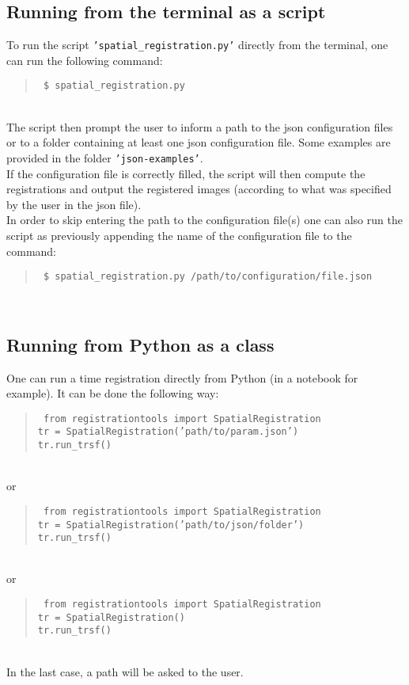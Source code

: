\documentclass[10pt,a4paper]{book}
\newcommand{\option}[1]{{\texttt{'#1'}}}
\newenvironment{code}[1]{\mbox{}\\[1ex]\hspace*{-#1cm}\begin{minipage}{150mm}\begin{quote}\tt}{\end{quote}\end{minipage}\mbox{}\\[1ex]}
\begin{document}
\subsection{Running from the terminal as a script}
To run the script \option{spatial\_registration.py} directly from the terminal, one can run the following command:
\begin{code}{0.8}
\$ spatial\_registration.py
\end{code}
The script then prompt the user to inform a path to the json configuration files or to a folder containing at least one json configuration file. Some examples are provided in the folder \option{json-examples}.\\
If the configuration file is correctly filled, the script will then compute the registrations and output the registered images (according to what was specified by the user in the json file).\\
In order to skip entering the path to the configuration file(s) one can also run the script as previously appending the name of the configuration file to the command:
\begin{code}{0.8}
\$ spatial\_registration.py /path/to/configuration/file.json
\end{code}

\subsection{Running from Python as a class}
One can run a time registration directly from Python (in a notebook for example). It can be done the following way:
\begin{code}{0.8}
from registrationtools import SpatialRegistration\\
tr = SpatialRegistration('path/to/param.json')\\
tr.run\_trsf()
\end{code}
or
\begin{code}{0.8}
from registrationtools import SpatialRegistration\\
tr = SpatialRegistration('path/to/json/folder')\\
tr.run\_trsf()
\end{code}
or
\begin{code}{0.8}
from registrationtools import SpatialRegistration\\
tr = SpatialRegistration()\\
tr.run\_trsf()
\end{code}
In the last case, a path will be asked to the user.
\end{document}
